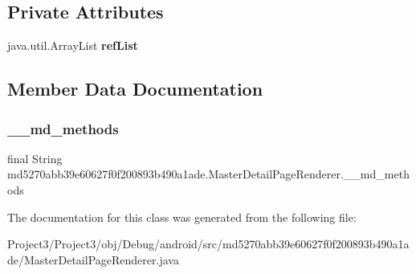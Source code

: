 \subsection*{Private Attributes}
\begin{DoxyCompactItemize}
\item 
\mbox{\label{classmd5270abb39e60627f0f200893b490a1ade_1_1MasterDetailPageRenderer_a395b49a7122df4c3416eb8930f6d33c3}} 
java.\+util.\+Array\+List {\bfseries ref\+List}
\end{DoxyCompactItemize}


\subsection{Member Data Documentation}
\mbox{\label{classmd5270abb39e60627f0f200893b490a1ade_1_1MasterDetailPageRenderer_a6531570f30e058588a00d29aa7c87230}} 
\subsubsection{\texorpdfstring{\+\_\+\+\_\+md\+\_\+methods}{\_\_md\_methods}}
{\footnotesize\ttfamily final String md5270abb39e60627f0f200893b490a1ade.\+Master\+Detail\+Page\+Renderer.\+\_\+\+\_\+md\+\_\+methods\hspace{0.3cm}{\ttfamily [static]}}



The documentation for this class was generated from the following file\+:\begin{DoxyCompactItemize}
\item 
Project3/\+Project3/obj/\+Debug/android/src/md5270abb39e60627f0f200893b490a1ade/Master\+Detail\+Page\+Renderer.\+java\end{DoxyCompactItemize}
